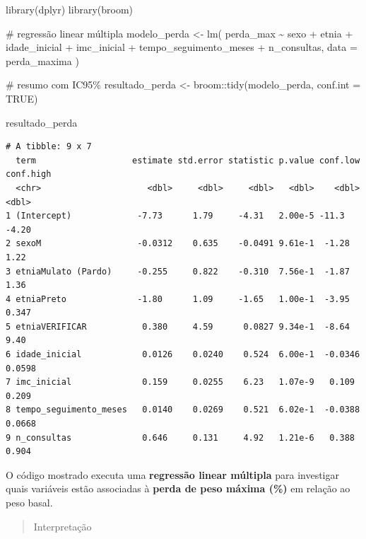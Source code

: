 \documentclass[
]{article}
\newenvironment{Shaded}{\begin{snugshade}}{\end{snugshade}}
\newcommand{\AttributeTok}[1]{\textcolor[rgb]{0.40,0.45,0.13}{#1}}
\newcommand{\CommentTok}[1]{\textcolor[rgb]{0.37,0.37,0.37}{#1}}
\newcommand{\ConstantTok}[1]{\textcolor[rgb]{0.56,0.35,0.01}{#1}}
\newcommand{\FunctionTok}[1]{\textcolor[rgb]{0.28,0.35,0.67}{#1}}
\newcommand{\NormalTok}[1]{\textcolor[rgb]{0.00,0.23,0.31}{#1}}
\newcommand{\OtherTok}[1]{\textcolor[rgb]{0.00,0.23,0.31}{#1}}
\newcommand{\SpecialCharTok}[1]{\textcolor[rgb]{0.37,0.37,0.37}{#1}}
\begin{document}
\begin{Shaded}
\begin{Highlighting}[]
\FunctionTok{library}\NormalTok{(dplyr)}
\FunctionTok{library}\NormalTok{(broom)}

\CommentTok{\# regressão linear múltipla}
\NormalTok{modelo\_perda }\OtherTok{\textless{}{-}} \FunctionTok{lm}\NormalTok{(}
\NormalTok{  perda\_max }\SpecialCharTok{\textasciitilde{}}\NormalTok{ sexo }\SpecialCharTok{+}\NormalTok{ etnia }\SpecialCharTok{+}\NormalTok{ idade\_inicial }\SpecialCharTok{+}\NormalTok{ imc\_inicial }\SpecialCharTok{+} 
\NormalTok{    tempo\_seguimento\_meses }\SpecialCharTok{+}\NormalTok{ n\_consultas,}
  \AttributeTok{data =}\NormalTok{ perda\_maxima}
\NormalTok{)}

\CommentTok{\# resumo com IC95\%}
\NormalTok{resultado\_perda }\OtherTok{\textless{}{-}}\NormalTok{ broom}\SpecialCharTok{::}\FunctionTok{tidy}\NormalTok{(modelo\_perda, }\AttributeTok{conf.int =} \ConstantTok{TRUE}\NormalTok{)}

\NormalTok{resultado\_perda}
\end{Highlighting}
\end{Shaded}

\begin{verbatim}
# A tibble: 9 x 7
  term                   estimate std.error statistic p.value conf.low conf.high
  <chr>                     <dbl>     <dbl>     <dbl>   <dbl>    <dbl>     <dbl>
1 (Intercept)             -7.73      1.79     -4.31   2.00e-5 -11.3      -4.20  
2 sexoM                   -0.0312    0.635    -0.0491 9.61e-1  -1.28      1.22  
3 etniaMulato (Pardo)     -0.255     0.822    -0.310  7.56e-1  -1.87      1.36  
4 etniaPreto              -1.80      1.09     -1.65   1.00e-1  -3.95      0.347 
5 etniaVERIFICAR           0.380     4.59      0.0827 9.34e-1  -8.64      9.40  
6 idade_inicial            0.0126    0.0240    0.524  6.00e-1  -0.0346    0.0598
7 imc_inicial              0.159     0.0255    6.23   1.07e-9   0.109     0.209 
8 tempo_seguimento_meses   0.0140    0.0269    0.521  6.02e-1  -0.0388    0.0668
9 n_consultas              0.646     0.131     4.92   1.21e-6   0.388     0.904 
\end{verbatim}

O código mostrado executa uma \textbf{regressão linear múltipla} para
investigar quais variáveis estão associadas à \textbf{perda de peso
máxima (\%)} em relação ao peso basal.

\begin{quote}
Interpretação
\end{quote}
\end{document}
